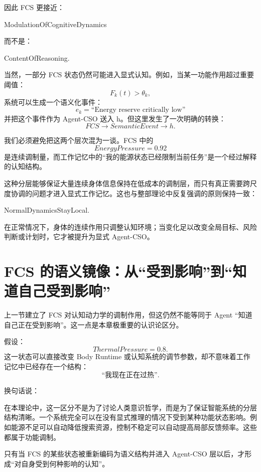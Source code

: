因此 FCS 更接近：
\begin{statementbox}
ModulationOfCognitiveDynamics
\end{statementbox}
而不是：
\begin{statementbox}
ContentOfReasoning.
\end{statementbox}

当然，一部分 FCS 状态仍然可能进入显式认知。例如，当某一功能作用超过重要阈值：
\[
F_k(t)>\theta_k,
\]
系统可以生成一个语义化事件：
\[
e_k=
\text{``Energy reserve critically low''}
\]
并把这个事件作为 Agent-CSO 送入 h。但这里发生了一次明确的转换：
\[
FCS
\longrightarrow
SemanticEvent
\longrightarrow
h.
\]

我们必须避免把这两个层次混为一谈。FCS 中的
\[
EnergyPressure=0.92
\]
是连续调制量，而工作记忆中的“我的能源状态已经限制当前任务”是一个经过解释的认知结构。

这种分层能够保证大量连续身体信息保持在低成本的调制层，而只有真正需要跨尺度协调的问题才进入显式工作记忆。这也与整部理论中反复强调的原则保持一致：
\begin{statementbox}
NormalDynamicsStayLocal.
\end{statementbox}

在正常情况下，身体的连续作用只调整认知环境；当变化足以改变全局目标、风险判断或计划时，它才被提升为显式 Agent-CSO。


\section{FCS 的语义镜像：从“受到影响”到“知道自己受到影响”}

上一节建立了 FCS 对认知动力学的调制作用，但这仍然不能等同于 Agent “知道自己正在受到影响”。这一点是本章极重要的认识论区分。

假设：
\[
ThermalPressure=0.8.
\]
这一状态可以直接改变 Body Runtime 或认知系统的调节参数，却不意味着工作记忆中已经存在一个结构：
\[
\text{``我现在正在过热''}.
\]

换句话说：
\begin{statementbox}
\centering
{}
\end{statementbox}

在本理论中，这一区分不是为了讨论人类意识哲学，而是为了保证智能系统的分层结构清晰。一个系统完全可以在没有显式推理的情况下受到某种功能状态影响。例如能源不足可以自动降低搜索资源，控制不稳定可以自动提高局部反馈频率。这些都属于功能调制。

只有当 FCS 的某些状态被重新编码为语义结构并进入 Agent-CSO 层以后，才形成“对自身受到何种影响的认知”。

